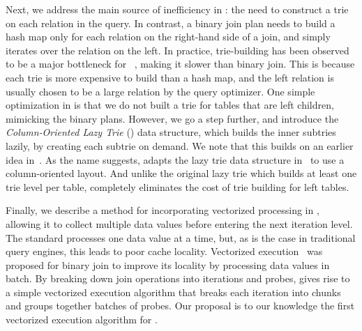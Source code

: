 Next, we address the main source of
  inefficiency in \GJ: the need to construct a trie on each relation
  in the query.  In contrast,  
a binary join plan needs to build a hash map only for each relation 
  on the right-hand side of a join,
  and simply iterates over the relation on the left.
In practice, trie-building has been observed to be a major 
  bottleneck for \GJ~\cite{DBLP:journals/pvldb/MhedhbiS19,DBLP:journals/pvldb/FreitagBSKN20}, 
  making it slower than binary join.
This is because each trie is more expensive to build than a hash map,
  and the left relation is usually chosen to be a large relation 
  by the query optimizer.
One simple optimization in \FJ is that we do not built a trie for
tables that are left children, mimicking the binary plans.
%
However, we go a step further, and introduce the {\em Column-Oriented
  Lazy Trie} (\COLT) data structure, which builds the inner subtries
  lazily, by creating each subtrie on demand.  
We note that this builds on an earlier idea
in~\cite{DBLP:journals/pvldb/FreitagBSKN20}.  As the name suggests,
\COLT adapts the lazy trie data structure
in~\cite{DBLP:journals/pvldb/FreitagBSKN20} to use a column-oriented
layout.  And unlike the original lazy trie which builds at least one
trie level per table, \COLT completely eliminates the cost of trie
building for left tables.


Finally, we describe a method for incorporating vectorized
  processing in \FJ, allowing it to collect multiple data values
  before entering the next iteration level.  
The standard \GJ processes one data value at a time, but, as is the
  case in traditional query engines, this leads to poor cache
  locality.  
Vectorized execution~\cite{DBLP:conf/icde/PadmanabhanAMJ01} was proposed for binary join
  to improve its locality by processing data values in batch.
By breaking down join operations into iterations and probes, 
  \FJ gives rise to a simple vectorized execution algorithm
  that breaks each iteration into chunks and groups together 
  batches of probes.
Our proposal is to our knowledge the first vectorized execution algorithm for \GJ.

